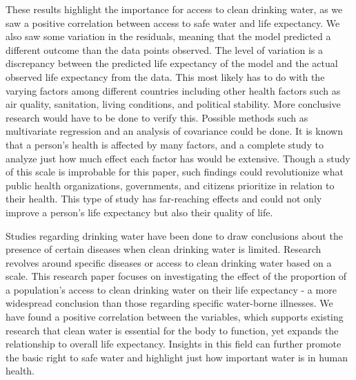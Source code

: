 \documentclass[12pt]{article}
\begin{document}
These results highlight the importance for access to clean drinking water, as we saw a positive correlation between access to safe water and life expectancy. We also saw some variation in the residuals, meaning that the model predicted a different outcome than the data points observed. The level of variation is a discrepancy between the predicted life expectancy of the model and the actual observed life expectancy from the data. This most likely has to do with the varying factors among different countries including other health factors such as air quality, sanitation, living conditions, and political stability. More conclusive research would have to be done to verify this. Possible methods such as multivariate regression and an analysis of covariance could be done. It is known that a person's health is affected by many factors, and a complete study to analyze just how much effect each factor has would be extensive. Though a study of this scale is improbable for this paper, such findings could revolutionize what public health organizations, governments, and citizens prioritize in relation to their health. This type of study has far-reaching effects and could not only improve a person's life expectancy but also their quality of life.

Studies regarding drinking water have been done to draw conclusions about the presence of certain diseases when clean drinking water is limited. Research revolves around specific diseases or access to clean drinking water based on a scale. This research paper focuses on investigating the effect of the proportion of a population's access to clean drinking water on their life expectancy - a more widespread conclusion than those regarding specific water-borne illnesses. We have found a positive correlation between the variables, which supports existing research that clean water is essential for the body to function, yet expands the relationship to overall life expectancy. Insights in this field can further promote the basic right to safe water and highlight just how important water is in human health.

\newpage



\end{document}
